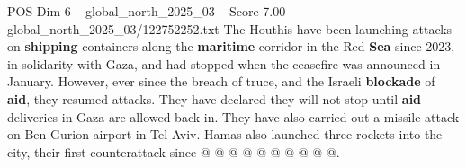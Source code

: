 \begin{textsample}{POS Dim 6 – global\_north\_2025\_03 – Score 7.00 – global\_north\_2025\_03/122752252.txt}
The Houthis have been launching attacks on \textbf{shipping} containers along the \textbf{maritime} corridor in the Red \textbf{Sea} since 2023, in solidarity with Gaza, and had stopped when the ceasefire was announced in January.
However, ever since the breach of truce, and the Israeli \textbf{blockade} of \textbf{aid}, they resumed attacks.
They have declared they will not stop until \textbf{aid} deliveries in Gaza are allowed back in.
They have also carried out a missile attack on Ben Gurion airport in Tel Aviv.
Hamas also launched three rockets into the city, their first counterattack since @ @ @ @ @ @ @ @ @ @.

\end{textsample}
